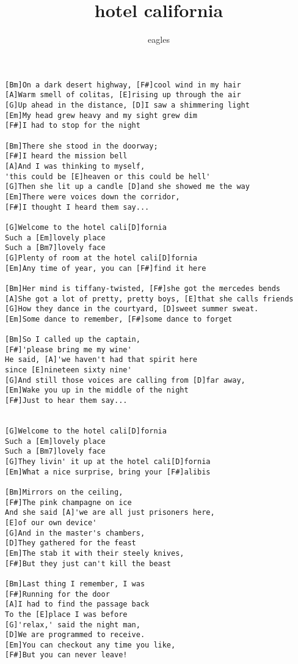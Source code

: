 \author{eagles}
\title{hotel california}
\maketitle
\begin{verbatim}
[Bm]On a dark desert highway, [F#]cool wind in my hair
[A]Warm smell of colitas, [E]rising up through the air
[G]Up ahead in the distance, [D]I saw a shimmering light
[Em]My head grew heavy and my sight grew dim
[F#]I had to stop for the night

[Bm]There she stood in the doorway;
[F#]I heard the mission bell
[A]And I was thinking to myself,
'this could be [E]heaven or this could be hell'
[G]Then she lit up a candle [D]and she showed me the way
[Em]There were voices down the corridor,
[F#]I thought I heard them say...

[G]Welcome to the hotel cali[D]fornia
Such a [Em]lovely place
Such a [Bm7]lovely face
[G]Plenty of room at the hotel cali[D]fornia
[Em]Any time of year, you can [F#]find it here

[Bm]Her mind is tiffany-twisted, [F#]she got the mercedes bends
[A]She got a lot of pretty, pretty boys, [E]that she calls friends
[G]How they dance in the courtyard, [D]sweet summer sweat.
[Em]Some dance to remember, [F#]some dance to forget

[Bm]So I called up the captain,
[F#]'please bring me my wine'
He said, [A]'we haven't had that spirit here
since [E]nineteen sixty nine'
[G]And still those voices are calling from [D]far away,
[Em]Wake you up in the middle of the night
[F#]Just to hear them say...


[G]Welcome to the hotel cali[D]fornia
Such a [Em]lovely place
Such a [Bm7]lovely face
[G]They livin' it up at the hotel cali[D]fornia
[Em]What a nice surprise, bring your [F#]alibis

[Bm]Mirrors on the ceiling,
[F#]The pink champagne on ice
And she said [A]'we are all just prisoners here,
[E]of our own device'
[G]And in the master's chambers,
[D]They gathered for the feast
[Em]The stab it with their steely knives,
[F#]But they just can't kill the beast

[Bm]Last thing I remember, I was
[F#]Running for the door
[A]I had to find the passage back
To the [E]place I was before
[G]'relax,' said the night man,
[D]We are programmed to receive.
[Em]You can checkout any time you like,
[F#]But you can never leave! 
\end{verbatim}